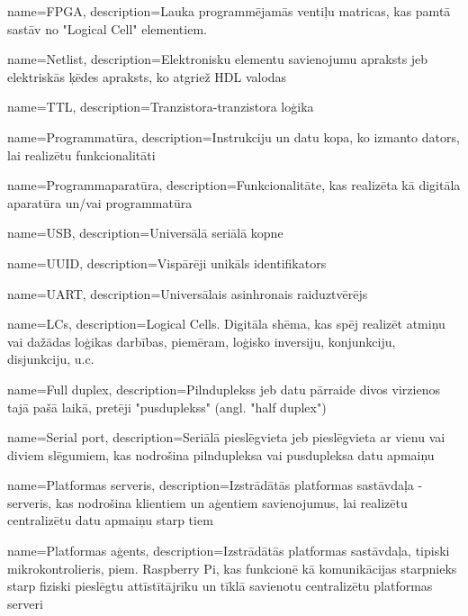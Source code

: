 \makeglossaries

{
    name=FPGA,
    description={Lauka programmējamās ventiļu matricas, kas pamtā sastāv no "Logical Cell" elementiem.}
}

{
    name=Netlist,
    description={Elektronisku elementu savienojumu apraksts jeb elektriskās ķēdes apraksts, ko atgriež HDL valodas}
}

{
    name=TTL,
    description={Tranzistora-tranzistora loģika}
}

{
    name=Programmatūra,
    description={Instrukciju un datu kopa, ko izmanto dators, lai realizētu funkcionalitāti}
}

{
    name=Programmaparatūra,
    description={Funkcionalitāte, kas realizēta kā digitāla aparatūra un/vai programmatūra}
}

{
    name=USB,
    description={Universālā seriālā kopne}
}

{
    name=UUID,
    description={Vispārēji unikāls identifikators}
}

{
    name=UART,
    description={Universālais asinhronais raiduztvērējs}
}

{
    name=LCs,
    description={Logical Cells. Digitāla shēma, kas spēj realizēt atmiņu vai dažādas loģikas darbības, piemēram, loģisko inversiju, konjunkciju, disjunkciju, u.c.}
}

{
    name=Full duplex,
    description={Pilnduplekss jeb datu pārraide divos virzienos tajā pašā laikā, pretēji "pusduplekss" (angl. "half duplex")}
}

{
    name=Serial port,
    description={Seriālā pieslēgvieta jeb pieslēgvieta ar vienu vai diviem slēgumiem, kas nodrošina pilndupleksa 
        vai pusdupleksa datu apmaiņu}
}

{
    name=Platformas serveris,
    description={Izstrādātās platformas sastāvdaļa - serveris, kas nodrošina klientiem un aģentiem savienojumus, 
        lai realizētu centralizētu datu apmaiņu starp tiem}
}

{
    name=Platformas aģents,
    description={Izstrādātās platformas sastāvdaļa, tipiski mikrokontrolieris, piem. Raspberry Pi, kas 
        funkcionē kā komunikācijas starpnieks starp fiziski pieslēgtu attīstītājrīku un tīklā 
        savienotu centralizētu platformas serveri}
}

